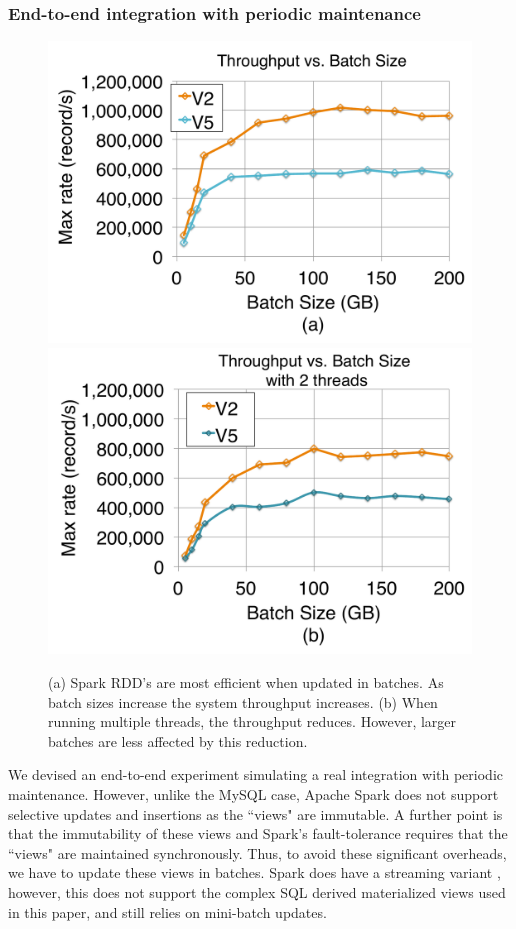 \subsubsection{End-to-end integration with periodic maintenance}
\begin{figure}[t]
\centering
 \includegraphics[scale=0.14]{exp/con_1.pdf}
 \includegraphics[scale=0.14]{exp/con_2.pdf}
 \caption{(a) Spark RDD's are most efficient when updated in batches. As batch sizes increase the system throughput increases. (b) When running multiple threads, the throughput reduces. However, larger batches are less affected by this reduction. \label{conv-2}}
\end{figure}

We devised an end-to-end experiment simulating a real integration with periodic maintenance.
However, unlike the MySQL case, Apache Spark does not support selective updates and insertions as the ``views" are immutable.
A further point is that the immutability of these views and Spark's fault-tolerance requires that the ``views" are maintained synchronously.
Thus, to avoid these significant overheads, we have to update these views in batches.
Spark does have a streaming variant \cite{zaharia2012discretized}, however, this does not support the complex SQL derived materialized views used in this paper, and still relies on mini-batch updates.


